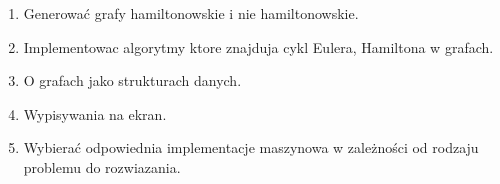 \documentclass[12pt]{article}
\begin{document}
\begin{enumerate}

	\item
	      Generować grafy hamiltonowskie i nie hamiltonowskie.
	\item
		  Implementowac algorytmy ktore znajduja cykl Eulera, Hamiltona w grafach.
	\item
		  O grafach jako strukturach danych.
    \item
    	      Wypisywania na ekran.
  	\item
  		  Wybierać odpowiednia implementacje maszynowa w zależności od rodzaju problemu do rozwiazania.

\end{enumerate}

\tableofcontents
\end{document}
